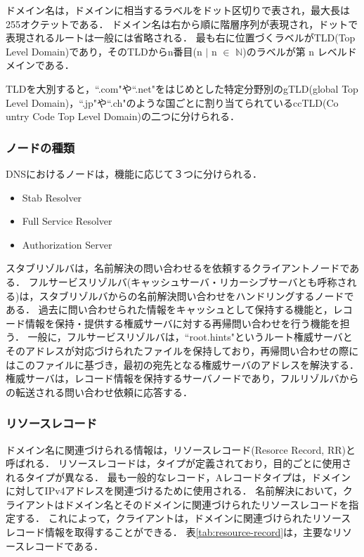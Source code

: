 ドメイン名は，ドメインに相当するラベルをドット区切りで表され，最大長は255オクテットである．
ドメイン名は右から順に階層序列が表現され，ドットで表現されるルートは一般には省略される．
最も右に位置づくラベルがTLD(Top Level Domain)であり，そのTLDからn番目(n $\mid$ n $\in$ $\mathbb{N}$)のラベルが第 n レベルドメインである．

TLDを大別すると，``.com"や``.net"をはじめとした特定分野別のgTLD(global Top Level Domain)，``.jp"や``.ch"のような国ごとに割り当てられているccTLD(Co\\untry Code Top Level Domain)の二つに分けられる．


\subsubsection{ノードの種類}
DNSにおけるノードは，機能に応じて３つに分けられる．
\begin{itemize}
 \item Stab Resolver
 \vspace{-3mm}
 \item Full Service Resolver
 \vspace{-3mm}
 \item Authorization Server
\end{itemize}

スタブリゾルバは，名前解決の問い合わせるを依頼するクライアントノードである．
フルサービスリゾルバ(キャッシュサーバ・リカーシブサーバとも呼称される)は，スタブリゾルバからの名前解決問い合わせをハンドリングするノードである．
過去に問い合わせられた情報をキャッシュとして保持する機能と，レコード情報を保持・提供する権威サーバに対する再帰問い合わせを行う機能を担う．
一般に，フルサービスリゾルバは，``root.hints"というルート権威サーバとそのアドレスが対応づけられたファイルを保持しており，再帰問い合わせの際にはこのファイルに基づき，最初の宛先となる権威サーバのアドレスを解決する．
権威サーバは，レコード情報を保持するサーバノードであり，フルリゾルバからの転送される問い合わせ依頼に応答する．

\subsubsection{リソースレコード}
ドメイン名に関連づけられる情報は，リソースレコード(Resorce Record, RR)と呼ばれる．
リソースレコードは，タイプが定義されており，目的ごとに使用されるタイプが異なる．
最も一般的なレコード，Aレコードタイプは，ドメインに対してIPv4アドレスを関連づけるために使用される．
名前解決において，クライアントはドメイン名とそのドメインに関連づけられたリソースレコードを指定する．
これによって，クライアントは，ドメインに関連づけられたリソースレコード情報を取得することができる．
表\ref{tab:resource-record}は，主要なリソースレコードである．


